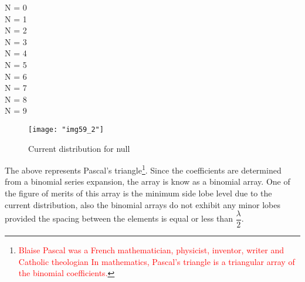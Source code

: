 	N = 0\; \; \; \; \; \; \; \; \; \; \; \; \; \; \;\; \; \; \; \\
	
	N = 1\; \; \; \; \; \; \; \; \; \; \; \; \; \; \;\; \;  \; \; \\
	
	N = 2\; \; \; \; \; \; \; \; \; \; \; \; \; \; \; \; \;  \; \; \\
	
	N = 3\; \; \; \; \; \; \; \; \; \; \; \; \;  \; \;  \; \;  \; \; \\
	
	N = 4\; \; \; \; \; \; \; \; \; \; \;  \; \;  \; \;  \; \;  \; \;  \\
	
	N = 5\; \; \; \; \; \; \; \; \;  \; \;  \; \;  \; \;  \; \;  \; \; \\
	
	N = 6\; \; \; \; \; \; \;  \; \;  \; \;  \; \;  \; \;  \; \;  \; \; \\
	
	N = 7\; \; \; \; \;  \; \;  \; \;  \; \;  \; \;  \; \;  \; \;  \; \; \\
	
	N = 8\; \; \;  \; \;  \; \;  \; \;  \; \;  \; \;  \; \;  \; \;  \; \; \\
	
	N = 9\; \;   \;  \; \;  \; \;  \; \;\; \; \;  \; \;  \; \;  \; \; \\
	\begin{figure}[H]
		\centering
		\texttt{[image: "img59\_2"]}
		\caption{Current distribution for null}
		\label{fig:fig-1}
	\end{figure}
	The above represents Pascal's triangle\footnote{\textcolor{red}{Blaise Pascal was a French mathematician, physicist, inventor, writer and Catholic theologian In mathematics, Pascal's triangle is a triangular array of the binomial coefficients.}}. Since the coefficients are determined from a binomial series expansion, the array is know as a binomial array. One of the figure of merits of this array is the minimum side lobe level due to the current distribution, also the binomial arrays do not exhibit any minor lobes provided the spacing between the elements is equal or less than $\dfrac{\lambda}{2}$.\\
	
